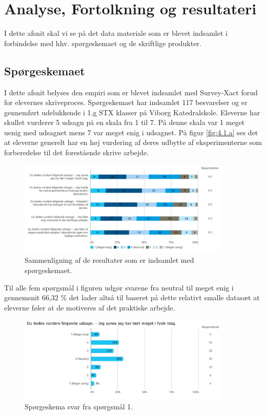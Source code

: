 \chapter{Analyse, Fortolkning og resultateri}
\label{Ch:4}

I dette afsnit skal vi se på det data materiale som er blevet indsamlet i forbindelse med hhv. spørgeskemaet og de skriftlige produkter. 

\section{Spørgeskemaet}
\label{Sec:4.1}

I dette afsnit belyses den empiri som er blevet indsamlet med Survey-Xact forud for elevernes skriveproces. Spørgeskemaet har indsamlet 117 besvarelser og er gennemført udelukkende i 1.g STX klasser på Viborg Katedralskole. Eleverne har skullet vurderer 5 udsagn på en skala fra 1 til 7. På denne skala var 1 meget uenig med udsagnet mens 7 var meget enig i udsagnet. 
På figur \vref{fig:4.1.a} ses det at eleverne generelt har en høj vurdering af deres udbytte af eksperimenterne som forberedelse til det forestående skrive arbejde. 

\begin{figure}[h!]
	\centering
	\includegraphics[width=0.9\textwidth]{Figs/Sammenlign}
	\caption{Sammenligning af de resultater som er indsamlet med spørgeskemaet.}
	\label{fig:4.1.a}
\end{figure}

Til alle fem spørgsmål i figuren udgør svarene fra neutral til meget enig i gennemsnit 66,32 \% det lader altså til baseret på dette relativt smalle datasæt at eleverne føler at de motiveres af det praktiske arbejde.

\begin{figure}[h!]
	\centering
	\includegraphics[width=0.9\textwidth]{Figs/Sp1}
	\caption{Spørgeskema svar fra spørgsmål 1.}
	\label{fig:4.1.b}
\end{figure}


